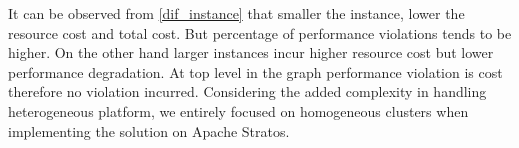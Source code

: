 It can be observed from \ref{dif_instance} that smaller the instance, lower the resource cost and total cost. But percentage of performance violations tends to be higher. On the other hand larger instances incur higher resource cost but lower performance degradation. At top level in the graph performance violation is cost therefore no violation incurred. Considering the added complexity in handling heterogeneous platform, we entirely focused on homogeneous clusters when implementing the solution on Apache Stratos.